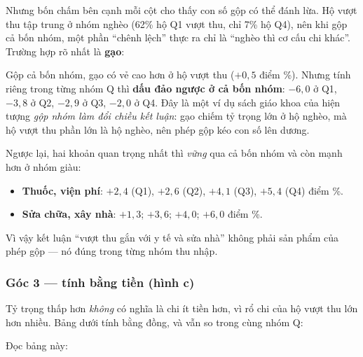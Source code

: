 \documentclass[11pt,a4paper]{article}
\newcommand{\n}[1]{\textbf{#1}}
\newcommand{\tblfit}[1]{\resizebox{\linewidth}{!}{}}
\begin{document}
Nhưng bốn chấm bên cạnh mỗi cột cho thấy con số gộp có thể đánh lừa. Hộ vượt thu tập trung ở nhóm nghèo (62\% hộ Q1 vượt thu, chỉ 7\% hộ Q4), nên khi gộp cả bốn nhóm, một phần “chênh lệch” thực ra chỉ là “nghèo thì cơ cấu chi khác”. Trường hợp rõ nhất là \n{gạo}:

\begin{table}[H]\centering\small
\caption{Chênh lệch tỷ trọng (điểm \%) giữa hộ vượt thu và hộ cân đối, tính riêng trong từng nhóm Q}
\tblfit{t_behavior_q}
\end{table}

Gộp cả bốn nhóm, gạo có vẻ cao hơn ở hộ vượt thu ($+0{,}5$ điểm \%). Nhưng tính riêng trong từng nhóm Q thì \n{dấu đảo ngược ở cả bốn nhóm}: $-6{,}0$ ở Q1, $-3{,}8$ ở Q2, $-2{,}9$ ở Q3, $-2{,}0$ ở Q4. Đây là một ví dụ sách giáo khoa của hiện tượng \emph{gộp nhóm làm đổi chiều kết luận}: gạo chiếm tỷ trọng lớn ở hộ nghèo, mà hộ vượt thu phần lớn là hộ nghèo, nên phép gộp kéo con số lên dương.

Ngược lại, hai khoản quan trọng nhất thì \emph{vững} qua cả bốn nhóm và còn mạnh hơn ở nhóm giàu:

\begin{itemize}[leftmargin=1.2em,itemsep=2pt,topsep=2pt]
\item \n{Thuốc, viện phí}: $+2{,}4$ (Q1), $+2{,}6$ (Q2), $+4{,}1$ (Q3), $+5{,}4$ (Q4) điểm \%.
\item \n{Sửa chữa, xây nhà}: $+1{,}3$; $+3{,}6$; $+4{,}0$; $+6{,}0$ điểm \%.
\end{itemize}

Vì vậy kết luận “vượt thu gắn với y tế và sửa nhà” không phải sản phẩm của phép gộp — nó đúng trong từng nhóm thu nhập.

\subsubsection{Góc 3 — tính bằng tiền (hình c)}

Tỷ trọng thấp hơn \emph{không} có nghĩa là chi ít tiền hơn, vì rổ chi của hộ vượt thu lớn hơn nhiều. Bảng dưới tính bằng đồng, và vẫn so trong cùng nhóm Q:

\begin{table}[H]\centering\small
\caption{Chi bình quân đầu người của hộ vượt thu gấp bao nhiêu lần hộ cân đối, trong cùng nhóm Q (số lần)}
\tblfit{t_behavior_money}
\end{table}

Đọc bảng này:
\end{document}
